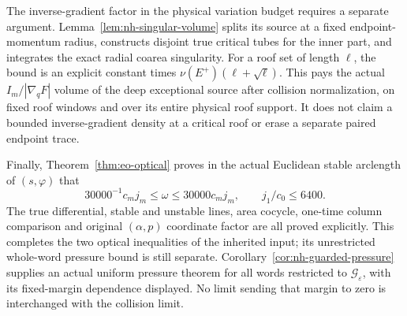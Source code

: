 The inverse-gradient factor in the physical variation budget
requires a separate argument. Lemma~\ref{lem:nh-singular-volume}
splits its source at a fixed endpoint-momentum radius, constructs
disjoint true critical tubes for the inner part, and integrates
the exact radial coarea singularity. For a roof set of length
$\ell$, the bound is an explicit constant times
$\nu(E^+)(\ell+\sqrt\ell)$. This pays the actual
$I_m/|\nabla_qF|$ volume of the deep exceptional source after
collision normalization, on fixed roof windows and over its
entire physical roof support. It does not claim a bounded
inverse-gradient density at a critical roof or erase a separate
paired endpoint trace.

Finally, Theorem~\ref{thm:eo-optical} proves in the actual
Euclidean stable arclength of $(s,\varphi)$ that
\[
 30000^{-1}c_mj_m\le\omega\le30000c_mj_m,
                         \qquad j_1/c_0\le6400.
\]
The true differential, stable and unstable lines, area cocycle,
one-time column comparison and original $(\alpha,p)$ coordinate
factor are all proved explicitly. This completes the two optical
inequalities of the inherited input; its unrestricted whole-word
pressure bound is still separate.
Corollary~\ref{cor:nh-guarded-pressure} supplies an actual uniform
pressure theorem for all words restricted to
$\mathcal G_\varepsilon$, with its fixed-margin dependence
displayed. No limit sending that margin to zero is interchanged
with the collision limit.

